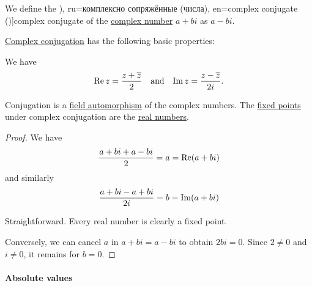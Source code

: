 \begin{definition}\label{def:complex_conjugation}
  We define the \term[bg=(комплексно) спрегнато (число) (\cite[298]{ИлинСадовничиСендов1984АнализТом1}), ru=комплексно сопряжённые (числа), en=complex conjugate (\cite[7]{Ahlfors1979ComplexAnalysis})]{complex conjugate} of the \hyperref[def:complex_numbers]{complex number} \( a + bi \) as \( a - bi \).
\end{definition}

\begin{proposition}\label{thm:def:complex_conjugation}
  \hyperref[def:complex_conjugation]{Complex conjugation} has the following basic properties:
  \begin{thmenum}
     We have
    \begin{align*}
      \real z = \frac {z + \oline z} 2
      &&\T{and}&&
      \imag z = \frac {z - \oline z} {2i}.
    \end{align*}

     Conjugation is a \hyperref[def:field/homomorphism]{field automorphism} of the complex numbers.
     The \hyperref[def:fixed_point]{fixed points} under complex conjugation are the \hyperref[def:real_numbers]{real numbers}.
  \end{thmenum}
\end{proposition}
\begin{proof}
   We have
  \begin{equation*}
    \frac {a + bi + a - bi} 2 = a = \operatorname{Re}(a + bi)
  \end{equation*}
  and similarly
  \begin{equation*}
    \frac {a + bi - a + bi} {2i} = b = \operatorname{Im}(a + bi)
  \end{equation*}

   Straightforward.
   Every real number is clearly a fixed point.

  Conversely, we can cancel \( a \) in \( a + bi = a - bi \) to obtain \( 2bi = 0 \). Since \( 2 \neq 0 \) and \( i \neq 0 \), it remains for \( b = 0 \).
\end{proof}

\paragraph{Absolute values}

